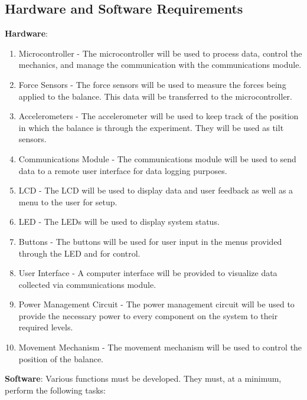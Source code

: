 	\subsection{Hardware and Software Requirements}
	\textbf{Hardware}:
		\begin{enumerate}
		\item Microcontroller - The microcontroller will be used to process data, control the mechanics, and manage the communication with the communications module.

 		\item Force Sensors - The force sensors will be used to measure the forces being applied to the balance. This data will be transferred to the microcontroller.
 
 		\item Accelerometers - The accelerometer will be used to keep track of the position in which the balance is through the experiment. They will be used as tilt sensors.

 		\item Communications Module - The communications module will be used to send data to a remote user interface for data logging purposes.

		\item LCD - The LCD will be used to display data and user feedback as well as a menu to the user for setup.

		\item LED - The LEDs will be used to display system status.

		\item Buttons - The buttons will be used for user input in the menus provided through the LED and for control.

		\item User Interface - A computer interface will be provided to visualize data collected via communications module.

		\item Power Management Circuit -  The power management circuit will be used to provide the necessary power to every component on the system to their required levels.

		\item Movement Mechanism - The movement mechanism will be used to control the position of the balance.
	\end{enumerate}
	\textbf{Software}:
	Various functions must be developed. They must, at a minimum, perform the following tasks: 
